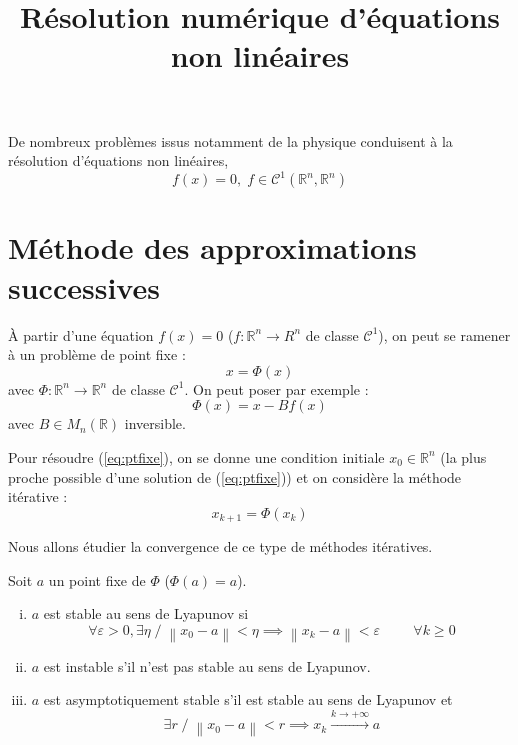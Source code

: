 \documentclass[a4paper,11pt]{article}
\title{\huge \bfseries Résolution numérique d'équations non linéaires}
\date{}
\newcommand{\R}{\mathbb{R}}
\newcommand{\norm}[1]{\left\lVert#1\right\rVert}
\theoremstyle{plain} %
\begin{document}
\maketitle

De nombreux problèmes issus notamment de la physique conduisent à la résolution d'équations non linéaires,
\[
    f(x)=0, \; f \in \mathcal{C}^1(\R^n,\R^n)
\]

\section{Méthode des approximations successives}

À partir d'une équation $f(x) = 0$ ($f : \R^n \to R^n$ de classe $\mathcal{C}^1$),
on peut se ramener à un problème de point fixe :
\begin{equation}
    x = \Phi(x)
    \label{eq:ptfixe}
\end{equation}
avec $\Phi : \R^n \to \R^n$ de classe $\mathcal{C}^1$. On peut poser par exemple :
\begin{equation*}
    \Phi(x) = x - B f(x)
\end{equation*}
avec $B \in M_n(\R)$ inversible.

Pour résoudre (\ref{eq:ptfixe}), on se donne une condition initiale $x_0 \in \R^n$ (la plus proche possible d'une solution de (\ref{eq:ptfixe})) et on considère la méthode itérative :
\begin{equation}
    x_{k+1} = \Phi(x_k)
    \label{eq:methodeiterative}
\end{equation}

Nous allons étudier la convergence de ce type de méthodes itératives.

\begin{fdef}
    Soit $a$ un point fixe de $\Phi$ ($\Phi(a) = a$).
    \begin{enumerate}[i)]
        \item $a$ est stable au sens de Lyapunov si
            \[
                \forall \varepsilon > 0, \exists \eta \; / \; \norm{x_0 - a} < \eta \implies \norm{x_k - a} < \varepsilon \hspace{1cm} \forall k \geq 0
            \]

        \item $a$ est instable s'il n'est pas stable au sens de Lyapunov.

        \item $a$ est asymptotiquement stable s'il est stable au sens de Lyapunov et
            \[
                \exists r \; / \; \norm{x_0 - a} < r \implies x_k \xrightarrow{k \to +\infty} a
            \]
    \end{enumerate}
\end{fdef}
\end{document}
